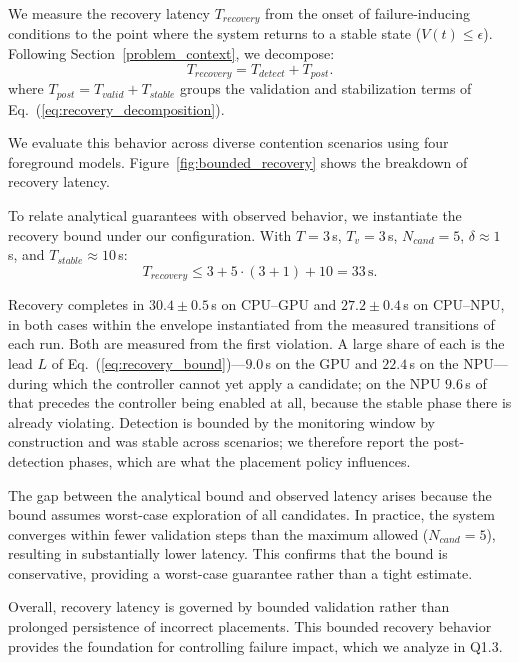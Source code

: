 \documentclass[conference]{IEEEtran}
\begin{document}
We measure the recovery latency $T_{recovery}$ from the onset of failure-inducing conditions to the point where the system returns to a stable state ($V(t) \le \epsilon$).
Following Section~\ref{problem_context}, we decompose:
\begin{equation}
T_{recovery} = T_{detect} + T_{post}.
\end{equation}
where $T_{post} = T_{valid} + T_{stable}$ groups the validation and stabilization terms of Eq.~(\ref{eq:recovery_decomposition}).

We evaluate this behavior across diverse contention scenarios using four foreground models.
Figure~\ref{fig:bounded_recovery} shows the breakdown of recovery latency.

To relate analytical guarantees with observed behavior, we instantiate the recovery bound under our configuration.
With $T=3$\,s, $T_v=3$\,s, $N_{cand}=5$, $\delta \approx 1$\,s, and $T_{stable} \approx 10$\,s:
\begin{equation}
T_{recovery} \le 3 + 5 \cdot (3 + 1) + 10 = 33\,\text{s}.
\end{equation}

\textcolor{navyblue}{Recovery completes in $30.4\pm0.5$\,s on CPU--GPU and $27.2\pm0.4$\,s on CPU--NPU, in both cases within the envelope instantiated from the measured transitions of each run. Both are measured from the first violation. A large share of each is the lead $L$ of Eq.~(\ref{eq:recovery_bound})---$9.0$\,s on the GPU and $22.4$\,s on the NPU---during which the controller cannot yet apply a candidate; on the NPU $9.6$\,s of that precedes the controller being enabled at all, because the stable phase there is already violating. Detection is bounded by the monitoring window by construction and was stable across scenarios; we therefore report the post-detection phases, which are what the placement policy influences.}

The gap between the analytical bound and observed latency arises because the bound assumes worst-case exploration of all candidates.
In practice, the system converges within fewer validation steps than the maximum allowed ($N_{cand}=5$), resulting in substantially lower latency.
This confirms that the bound is conservative, providing a worst-case guarantee rather than a tight estimate.

Overall, recovery latency is governed by bounded validation rather than prolonged persistence of incorrect placements.
This bounded recovery behavior provides the foundation for controlling failure impact, which we analyze in Q1.3.
\end{document}

